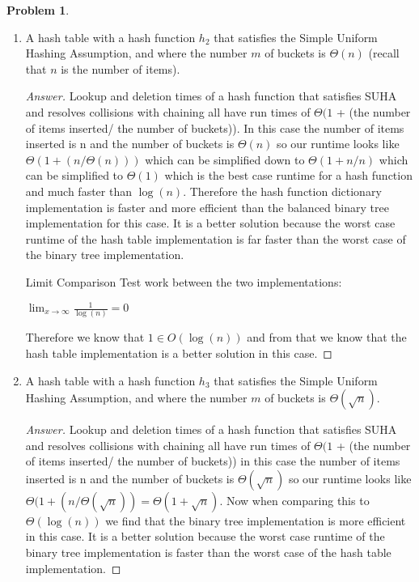 \documentclass[11pt]{article}
\theoremstyle{definition}
\theoremstyle{definition}
\newtheorem{required}{Problem}
\theoremstyle{definition}
\begin{document}
\begin{required}
\begin{enumerate}[label=(\alph*)]
\begin{proof}[Answer]
\end{proof}


\vskip 15pt
\item A hash table with a hash function $h_2$ that satisfies the Simple Uniform Hashing Assumption, and where the number $m$ of buckets is $\Theta(n)$ (recall that $n$ is the number of items).
\begin{proof}[Answer]

Lookup and deletion times of a hash function that satisfies SUHA and resolves collisions with chaining all have run times of $\Theta(1$ + (the number of items inserted/ the number of buckets)). In this case the number of items inserted is n and the number of buckets is $\Theta(n)$ so our runtime looks like $\Theta(1 +(n/\Theta(n)))$ which can be simplified down to $\Theta(1+n/n)$  which can be simplified to $\Theta(1)$ which is the best case runtime for a hash function and much faster than $\log(n)$. Therefore the hash function dictionary implementation is faster and more efficient than the balanced binary tree implementation for this case. It is a better solution because the worst case runtime of the hash table implementation is far faster than the worst case of the binary tree implementation. 

Limit Comparison Test work between the two implementations:

$\lim_{x\to\infty} \frac{1}{\log(n)} = 0$

Therefore we know that $1 \in O(\log(n))$ and from that we know that the hash table implementation is a better solution in this case.

\end{proof}


\vskip 15pt	
\item A hash table with a hash function $h_3$ that satisfies the Simple Uniform Hashing Assumption, and where the number $m$ of buckets is $\Theta(\sqrt{n})$.

\begin{proof}[Answer]


Lookup and deletion times of a hash function that satisfies SUHA and resolves collisions with chaining all have run times of $\Theta(1$ + (the number of items inserted/ the number of buckets)) in this case the number of items inserted is n and the number of buckets is $\Theta(\sqrt{n})$ so our runtime looks like $\Theta(1 +(n/\Theta(\sqrt{n})) = \Theta(1 + \sqrt{n})$. Now when comparing this to $\Theta(\log(n))$ we find that the binary tree implementation is more efficient in this case. It is a better solution because the worst case runtime of the binary tree implementation is faster than the worst case of the hash table implementation. 


\end{proof}
\end{enumerate}
\end{required}
\end{document}
